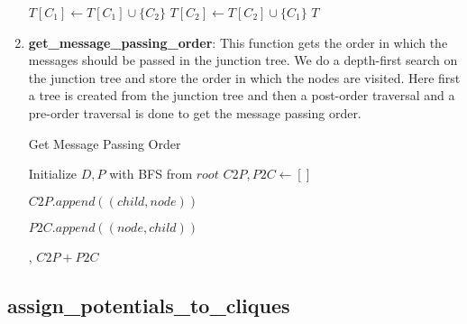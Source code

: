 \documentclass[12pt]{article}
\begin{document}
\begin{enumerate}
\begin{algorithm}
\begin{algorithmic}[1]
                    \State {}
                    \State $T[C_1] \gets T[C_1] \cup \{C_2\}$
                    \State $T[C_2] \gets T[C_2] \cup \{C_1\}$
                \EndIf
            \EndFor
            \State \Return $T$
        \EndFunction
        \end{algorithmic}
    \end{algorithm}

    \item \textbf{get\_message\_passing\_order}: This function gets the order in which the messages should be passed in the junction tree. We do a depth-first search on the junction tree and store the order in which the nodes are visited. Here first a tree is created from the junction tree and then a post-order traversal and a pre-order traversal is done to get the message passing order.
    
    \begin{algorithm}
        \caption{Get Message Passing Order}
        \begin{algorithmic}[1]
            \State Initialize $D, P$ with BFS from $root$
            \State $C2P, P2C \gets []$
        
                    \State {}
                    \State $C2P.append((child, node))$
                \EndFor
            \EndProcedure
        
                    \State $P2C.append((node, child))$
                    \State {}
                \EndFor
            \EndProcedure
        
            \State {}, 
            \State \Return $C2P + P2C$
        \EndFunction
        \end{algorithmic}
    \end{algorithm}
        
\end{enumerate}

\newpage

\subsection{assign\_potentials\_to\_cliques}
\end{document}
